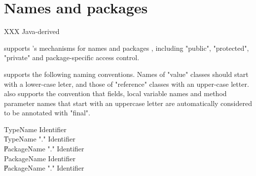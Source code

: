 \chapter{Names and packages}
\label{packages} 

XXX Java-derived

\Xten{} supports \java's mechanisms for names and packages \cite[\S
6,\S 7]{jls2}, including \xcd"public", \xcd"protected", \xcd"private"
and package-specific access control. 


\Xten{} supports the following naming conventions. Names of
\xcd"value" classes should start with a lower-case leter, and
those of \xcd"reference" classes with an upper-case letter. \Xten{} also 
supports the convention that fields, local variable names
and method parameter names that start with an uppercase letter are
automatically considered to be annotated with \xcd"final".
\label{LexicalConventionForFinals}


\begin{grammar}
TypeName   \: Identifier \\
        \| TypeName \xcd"." Identifier \\
        \| PackageName \xcd"." Identifier \\
PackageName   \: Identifier \\
        \| PackageName \xcd"." Identifier \\
\end{grammar}


